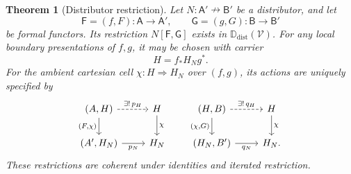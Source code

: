 \documentclass[11pt,reqno]{amsart}
\theoremstyle{plain}
\newtheorem{theorem}{Theorem}[section]
\theoremstyle{definition}
\theoremstyle{remark}
\numberwithin{equation}{section}
\newcommand{\V}{\mathcal V}
\newcommand{\Ddist}{\mathbb D_{\mathrm{dist}}}
\newcommand{\harr}{\mathrel{\nrightarrow}}
\newcommand{\cell}{\mathrel{\Longrightarrow}}
\begin{document}
\begin{theorem}[Distributor restriction]\label{thm:distrestriction}
Let $N:\mathsf A'\harr\mathsf B'$ be a distributor, and let
\[
 \mathsf F=(f,F):\mathsf A\to\mathsf A',\qquad
 \mathsf G=(g,G):\mathsf B\to\mathsf B'
\]
be formal functors. Its restriction $N[\mathsf F,\mathsf G]$ exists
in $\Ddist(\V)$. For any local boundary presentations of $f,g$, it may
be chosen with carrier
\begin{equation}\label{eq:distrestrictioncarrier}
 H=f_*H_Ng^*.
\end{equation}
For the ambient cartesian cell $\chi:H\cell H_N$ over $(f,g)$,
its actions are uniquely specified by
\begin{equation}\label{eq:distrestrictionactions}
\begin{tikzcd}
(A,H) \arrow[r,dashed,"\exists!\,p_H"] \arrow[d,"{(F,\chi)}"'] &
H \arrow[d,"\chi"]\\
(A',H_N) \arrow[r,"p_N"'] & H_N
\end{tikzcd}
\qquad
\begin{tikzcd}
(H,B) \arrow[r,dashed,"\exists!\,q_H"] \arrow[d,"{(\chi,G)}"'] &
H \arrow[d,"\chi"]\\
(H_N,B') \arrow[r,"q_N"'] & H_N.
\end{tikzcd}
\end{equation}
These restrictions are coherent under identities and iterated restriction.
\end{theorem}
\end{document}
